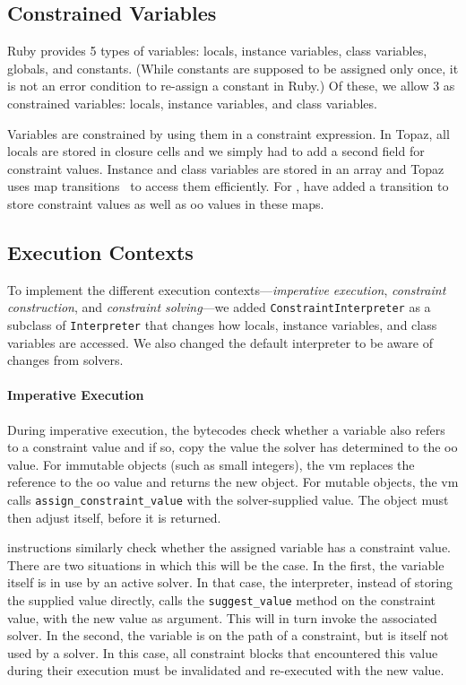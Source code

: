 \subsection{Constrained Variables}
\label{sec:constrained-variables-impl}
Ruby provides 5 types of variables: locals, instance variables, class
variables, globals, and constants.  (While constants are supposed to
be assigned only once, it is not an error condition to re-assign a
constant in Ruby.)  Of these, we allow 3 as constrained variables:
locals, instance variables, and class variables.

Variables are constrained by using them in a constraint expression. In
Topaz, all locals are stored in closure cells and we simply had to add
a second field for constraint values. Instance and class variables are
stored in an array and Topaz uses map
transitions~\cite{chambers1989efficient} to access them
efficiently. For \toolname, have added a transition to store
constraint values as well as \ac{oo} values in these maps.

\subsection{Execution Contexts}
\label{sec:constraint-construction-impl}

To implement the different execution contexts---\emph{imperative
  execution}, \emph{constraint construction}, and \emph{constraint
  solving}---we added \lstinline{ConstraintInterpreter} as a subclass
of \lstinline{Interpreter} that changes how locals, instance
variables, and class variables are accessed. We also changed the
default interpreter to be aware of changes from solvers.

\paragraph{Imperative Execution}
During imperative execution, the \load bytecodes check whether a
variable also refers to a constraint value and if so, copy the value
the solver has determined to the \ac{oo} value. For immutable objects
(such as small integers), the \ac{vm} replaces the reference to the
\ac{oo} value and returns the new object. For mutable objects, the
\ac{vm} calls \lstinline{assign_constraint_value} with the
solver-supplied value. The object must then adjust itself, before it
is returned.

\store instructions similarly check whether the assigned variable has
a constraint value.  There are two situations in which this will be
the case.  In the first, the variable itself is in use by an active
solver. In that case, the interpreter, instead of storing the supplied
value directly, calls the \lstinline{suggest_value} method on the
constraint value, with the new value as argument.  This will in turn
invoke the associated solver.  In the second, the variable is on the
path of a constraint, but is itself not used by a solver.  In this
case, all constraint blocks that encountered this value during their
execution must be invalidated and re-executed with the new value.

